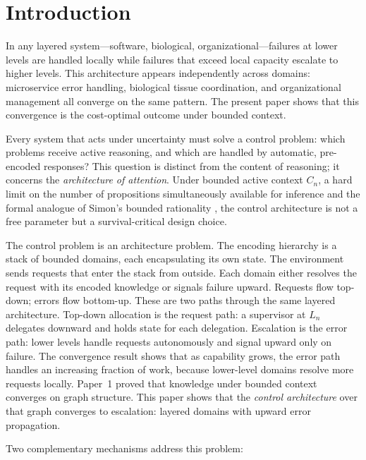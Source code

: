 \documentclass[11pt]{article}
\theoremstyle{definition}
\begin{document}
\section{Introduction}
\label{sec:intro}

In any layered system---software, biological, organizational---failures
at lower levels are handled locally while failures that exceed local
capacity escalate to higher levels. This architecture appears
independently across domains: microservice error handling,
biological tissue coordination, and organizational management all
converge on the same pattern. The present paper shows that this
convergence is the cost-optimal outcome under bounded context.

Every system that acts under uncertainty must solve a control problem:
which problems receive active reasoning, and which are handled by
automatic, pre-encoded responses? This question is distinct from the
content of reasoning; it concerns the \emph{architecture of
attention}. Under bounded active context $C_n$, a hard limit on the
number of propositions simultaneously available for inference and the
formal analogue of Simon's bounded rationality
\cite{Simon1955,Simon1962}, the control architecture is not a free
parameter but a survival-critical design choice.

The control problem is an architecture problem. The encoding hierarchy
is a stack of bounded domains, each encapsulating its own state. The
environment sends requests that enter the stack from outside. Each
domain either resolves the request with its encoded knowledge or
signals failure upward. Requests flow top-down; errors flow bottom-up.
These are two paths through the same layered architecture. Top-down
allocation is the request path: a supervisor at $L_n$ delegates
downward and holds state for each delegation. Escalation is the error
path: lower levels handle requests autonomously and signal upward only
on failure. The convergence result shows that as capability grows,
the error path handles an increasing fraction of work, because
lower-level domains resolve more requests locally. Paper~1
\cite{McCarthy2026a} proved that knowledge under bounded context
converges on graph structure. This paper shows that the
\emph{control architecture} over that graph converges to escalation:
layered domains with upward error propagation.

Two complementary mechanisms address this problem:
\end{document}
